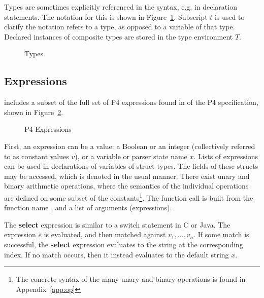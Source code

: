 \documentclass[UTF8]{article}
\begin{document}
Types are sometimes explicitly referenced in the syntax, e.g. in declaration statements. The notation for this is shown in Figure~\ref{fig:types}. Subscript $t$ is used to clarify the notation refers to a type, as opposed to a variable of that type. Declared instances of composite types are stored in the type environment $T$.

\begin{figure}[h!]
\centering\ottgrammartabular{
\ottbt\ottinterrule
\ottt\ottafterlastrule
}
\caption{Types}
\label{fig:types}
\end{figure}

\subsection{Expressions}
\newcommand{\fmap}{\textit{F}}

\pfott{} includes a subset of the full set of P4 expressions found in {} of the P4 specification, shown in Figure~\ref{fig:exp}.

\begin{figure}[h!]
\centering\ottgrammartabular{
\otte\ottafterlastrule
}
\caption{P4 Expressions}
\label{fig:exp}
\end{figure}
\newcommand{\stmt}{\textit{stmt}}
\newcommand{\cval}{\ensuremath{v}}
\newcommand{\fexec}[1]{\textbf{exec}\,\,#1}

First, an expression can be a value: a Boolean or an integer (collectively referred to as constant values \cval{}), or a variable or parser state name $x$. Lists of expressions can be used in declarations of variables of struct types. The fields of these structs may be accessed, which is denoted in the usual manner. There exist unary and binary arithmetic operations, where the semantics of the individual operations are defined on some subset of the constants\footnote{The concrete syntax of the many unary and binary operations is found in Appendix~\ref{app:op}}. The function call is built from the function name \fn{}, and a list of arguments (expressions). %

The \textbf{select} expression is similar to a switch statement in C or Java. The expression $e$ is evaluated, and then matched against $v_1 , \ldots , v_n$. If some match is successful, the \textbf{select} expression evaluates to the string at the corresponding index. If no match occurs, then it instead evaluates to the default string $x$.
\end{document}
